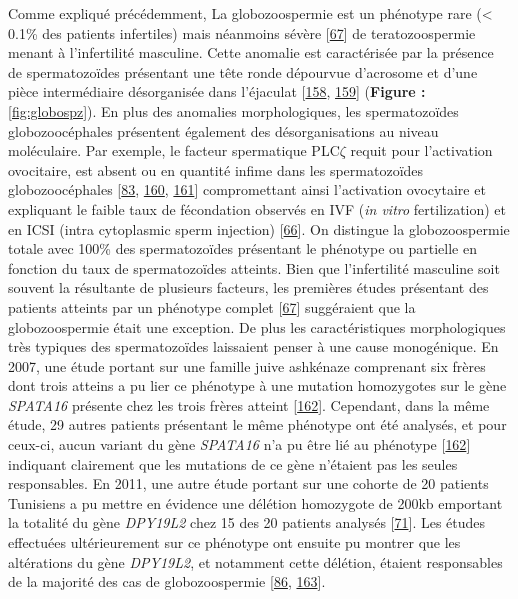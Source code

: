 \documentclass[12pt,twoside]{reedthesis}
\theoremstyle{definition}
\theoremstyle{definition}
\theoremstyle{remark}
\begin{document}
  Comme expliqué précédemment, La globozoospermie est un phénotype rare
  (\textless{} 0.1\% des patients infertiles) mais néanmoins sévère
  {[}\protect\hyperlink{ref-Sen2009}{67}{]} de teratozoospermie menant à
  l'infertilité masculine. Cette anomalie est caractérisée par la présence
  de spermatozoïdes présentant une tête ronde dépourvue d'acrosome et
  d'une pièce intermédiaire désorganisée dans l'éjaculat
  {[}\protect\hyperlink{ref-Singh}{158},
  \protect\hyperlink{ref-Pedersen1974}{159}{]} (\textbf{Figure :
  }\ref{fig:globospz}). En plus des anomalies morphologiques, les
  spermatozoïdes globozoocéphales présentent également des
  désorganisations au niveau moléculaire. Par exemple, le facteur
  spermatique PLC\(\zeta\) requit pour l'activation ovocitaire, est absent
  ou en quantité infime dans les spermatozoïdes globozoocéphales
  {[}\protect\hyperlink{ref-Heytens2009}{83},
  \protect\hyperlink{ref-Taylor2010}{160},
  \protect\hyperlink{ref-Yoon2008}{161}{]} compromettant ainsi
  l'activation ovocytaire et expliquant le faible taux de fécondation
  observés en IVF (\emph{in vitro} fertilization) et en ICSI (intra
  cytoplasmic sperm injection) {[}\protect\hyperlink{ref-Dam2006}{66}{]}.
  On distingue la globozoospermie totale avec 100\% des spermatozoïdes
  présentant le phénotype ou partielle en fonction du taux de
  spermatozoïdes atteints. Bien que l'infertilité masculine soit souvent
  la résultante de plusieurs facteurs, les premières études présentant des
  patients atteints par un phénotype complet
  {[}\protect\hyperlink{ref-Sen2009}{67}{]} suggéraient que la
  globozoospermie était une exception. De plus les caractéristiques
  morphologiques très typiques des spermatozoïdes laissaient penser à une
  cause monogénique. En 2007, une étude portant sur une famille juive
  ashkénaze comprenant six frères dont trois atteins a pu lier ce
  phénotype à une mutation homozygotes sur le gène \emph{SPATA16} présente
  chez les trois frères atteint
  {[}\protect\hyperlink{ref-Dam2007}{162}{]}. Cependant, dans la même
  étude, 29 autres patients présentant le même phénotype ont été analysés,
  et pour ceux-ci, aucun variant du gène \emph{SPATA16} n'a pu être lié au
  phénotype {[}\protect\hyperlink{ref-Dam2007}{162}{]} indiquant
  clairement que les mutations de ce gène n'étaient pas les seules
  responsables. En 2011, une autre étude portant sur une cohorte de 20
  patients Tunisiens a pu mettre en évidence une délétion homozygote de
  200kb emportant la totalité du gène \emph{DPY19L2} chez 15 des 20
  patients analysés {[}\protect\hyperlink{ref-Harbuz2011}{71}{]}. Les
  études effectuées ultérieurement sur ce phénotype ont ensuite pu montrer
  que les altérations du gène \emph{DPY19L2}, et notamment cette délétion,
  étaient responsables de la majorité des cas de globozoospermie
  {[}\protect\hyperlink{ref-ElInati2012}{86},
  \protect\hyperlink{ref-Ray2011}{163}{]}.
  
\end{document}

